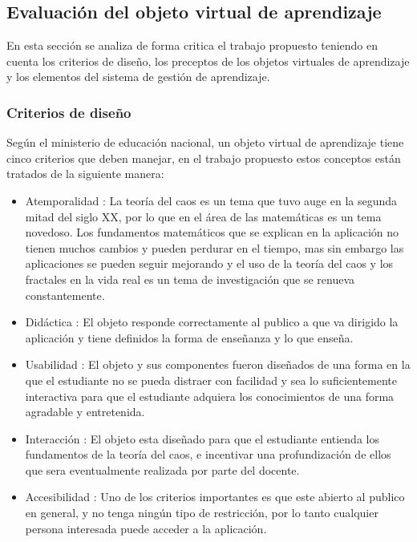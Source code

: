 \documentclass[letterpaper, 11pt, oneside]{article}
\theoremstyle{definition}
\theoremstyle{remark}
\begin{document}
 \clearpage
 \newpage
\subsection{Evaluación del objeto virtual de aprendizaje}
En esta sección se analiza de forma critica el trabajo propuesto teniendo en cuenta los criterios de diseño, los preceptos de los objetos virtuales de aprendizaje y los elementos del sistema de gestión de aprendizaje.

\subsubsection{Criterios de diseño}
Según el ministerio de educación nacional\cite{Roldan05}, un objeto virtual de aprendizaje tiene cinco criterios que deben manejar, en el trabajo propuesto estos conceptos están tratados de la siguiente manera:

\begin{itemize}
 \item Atemporalidad : La teoría del caos es un tema que tuvo auge en la segunda mitad del siglo XX, por lo que en el área de las matemáticas es un tema novedoso. Los fundamentos matemáticos que se explican en la aplicación no tienen muchos cambios y pueden perdurar en el tiempo, mas sin embargo las aplicaciones se pueden seguir mejorando y el uso de la teoría del caos y los fractales en la vida real es un tema de investigación que se renueva constantemente.
 \item Didáctica : El objeto responde correctamente al publico a que va dirigido la aplicación y tiene definidos la forma de enseñanza y lo que enseña.
 \item Usabilidad : El objeto y sus componentes fueron diseñados de una forma en la que el estudiante no se pueda distraer con facilidad y sea lo suficientemente interactiva para que el estudiante adquiera los conocimientos de una forma agradable y entretenida.
 \item Interacción :  El objeto esta diseñado para que el estudiante entienda los fundamentos de la teoría del caos, e incentivar una profundización de ellos que sera eventualmente realizada por parte del docente.
 \item Accesibilidad : Uno de los criterios importantes es que este abierto al publico en general, y no tenga ningún tipo de restricción, por lo tanto cualquier persona interesada puede acceder a la aplicación. 
\end{itemize}
 
\end{document}
